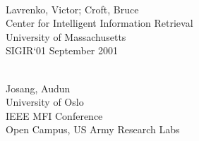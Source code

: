 \documentclass{article}
\begin{document}
\begin{thebibliography}{99}
        \\
        Lavrenko, Victor; Croft, Bruce\\
        Center for Intelligent Information Retrieval\\
        University of Massachusetts \\
        SIGIR`01 September 2001

        \\
        Josang, Audun\\
        University of Oslo\\
        IEEE MFI Conference\\
        Open Campus, US Army Research Labs


\end{thebibliography}
\end{document}
